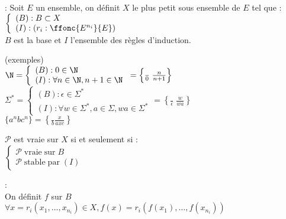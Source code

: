  : Soit $E$ un ensemble, on définit $X$ le plus petit sous ensemble de $E$ tel que : \\ $ \left\{ \begin{array}{l} (B) : B\subset X \\ (I) : (r_i : \ffonc{E^{n_i}}{E}) \end{array} \right. $ \\
$B$ est la base et $I$ l'ensemble des règles d'induction. \\

\par

 (exemples) \\
$\N = \left\{ \begin{array}{l} (B) : 0 \in \N \\ (I) : \forall n \in \N, n+1\in \N \end{array} \right.
= \left\{ \frac{}{0} \; \frac{n}{n+1} \right\}$\\
$\Sigma^* = \left\{ \begin{array}{l} (B) : \epsilon \in \Sigma^* \\ (I) : \forall w \in \Sigma^*, a\in\Sigma, wa\in \Sigma^* \end{array} \right. = \left\{ \frac{}{\epsilon} \; \frac{w}{wa} \right\}$ \\
$\{ a^nbc^n \} = \left\{ \frac{}{b} \frac{x}{axc} \right\}$ \\

\par

 $\mathcal{P}$ est vraie sur $X$ si et seulement si : \\
$\left\{ \begin{array}{l} \mathcal{P} \; \mathrm{vraie} \; \mathrm{sur} \; B \\ \mathcal{P} \; \mathrm{stable} \; \mathrm{par} \; (I) \end{array} \right.$ \\

\par

 : \\
On définit $f$ sur $B$ \\
$\forall x = r_i(x_1,\ldots,x_{n_i})\in X, f(x) = r_i(f(x_1),\ldots,f(x_{n_i}))$ 
